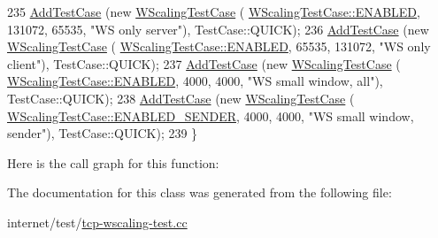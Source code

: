 \begin{DoxyCode}
235     \hyperlink{classns3_1_1TestCase_a3718088e3eefd5d6454569d2e0ddd835}{AddTestCase} (\textcolor{keyword}{new} \hyperlink{classWScalingTestCase}{WScalingTestCase} (
      \hyperlink{classWScalingTestCase_a6b31fa8be505eaac47c2383fb17dc5fdae72009ae17f1ed4d86c7c67734348f68}{WScalingTestCase::ENABLED}, 131072, 65535, \textcolor{stringliteral}{"WS only server"}), TestCase::QUICK);
236     \hyperlink{classns3_1_1TestCase_a3718088e3eefd5d6454569d2e0ddd835}{AddTestCase} (\textcolor{keyword}{new} \hyperlink{classWScalingTestCase}{WScalingTestCase} (
      \hyperlink{classWScalingTestCase_a6b31fa8be505eaac47c2383fb17dc5fdae72009ae17f1ed4d86c7c67734348f68}{WScalingTestCase::ENABLED}, 65535, 131072, \textcolor{stringliteral}{"WS only client"}), TestCase::QUICK);
237     \hyperlink{classns3_1_1TestCase_a3718088e3eefd5d6454569d2e0ddd835}{AddTestCase} (\textcolor{keyword}{new} \hyperlink{classWScalingTestCase}{WScalingTestCase} (
      \hyperlink{classWScalingTestCase_a6b31fa8be505eaac47c2383fb17dc5fdae72009ae17f1ed4d86c7c67734348f68}{WScalingTestCase::ENABLED}, 4000, 4000, \textcolor{stringliteral}{"WS small window, all"}), TestCase::QUICK);
238     \hyperlink{classns3_1_1TestCase_a3718088e3eefd5d6454569d2e0ddd835}{AddTestCase} (\textcolor{keyword}{new} \hyperlink{classWScalingTestCase}{WScalingTestCase} (
      \hyperlink{classWScalingTestCase_a6b31fa8be505eaac47c2383fb17dc5fda605d0a930221d4226dfee3e4c89b47a3}{WScalingTestCase::ENABLED\_SENDER}, 4000, 4000, \textcolor{stringliteral}{"WS small window, sender"}), 
      TestCase::QUICK);
239   \}
\end{DoxyCode}


Here is the call graph for this function\+:




The documentation for this class was generated from the following file\+:\begin{DoxyCompactItemize}
\item 
internet/test/\hyperlink{tcp-wscaling-test_8cc}{tcp-\/wscaling-\/test.\+cc}\end{DoxyCompactItemize}
